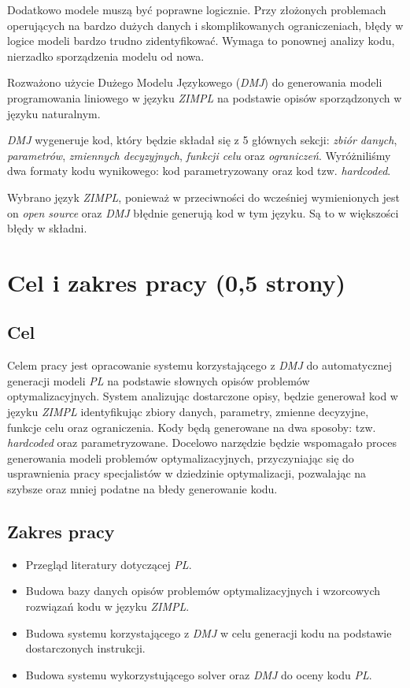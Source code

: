Dodatkowo modele muszą być poprawne logicznie. Przy złożonych problemach operujących na bardzo dużych danych i skomplikowanych ograniczeniach, błędy w logice modeli bardzo trudno zidentyfikować. Wymaga to ponownej analizy kodu, nierzadko sporządzenia modelu od nowa.

Rozważono użycie Dużego Modelu Językowego (\textit{DMJ}) do generowania modeli programowania liniowego w języku \textit{ZIMPL} na podstawie opisów sporządzonych w języku naturalnym.

\textit{DMJ} wygeneruje kod, który będzie składał się z 5 głównych sekcji: \textit{zbiór danych}, \textit{parametrów}, \textit{zmiennych decyzyjnych}, \textit{funkcji celu} oraz \textit{ograniczeń}. Wyróżniliśmy dwa formaty kodu wynikowego: kod parametryzowany oraz kod tzw. \textit{hardcoded}. 

Wybrano język \textit{ZIMPL}, ponieważ w przeciwności do wcześniej wymienionych jest on \textit{open source} oraz \textit{DMJ} błędnie generują kod w tym języku. Są to w większości błędy w składni.

\section{Cel i zakres pracy (0,5 strony)}

\subsection{Cel}
Celem pracy jest opracowanie systemu korzystającego z \textit{DMJ} do automatycznej generacji modeli \textit{PL} na podstawie słownych opisów problemów optymalizacyjnych. System analizując dostarczone opisy, będzie generował kod w języku \textit{ZIMPL} identyfikując zbiory danych, parametry, zmienne decyzyjne, funkcje celu oraz ograniczenia. Kody będą generowane na dwa sposoby: tzw. \textit{hardcoded} oraz parametryzowane. Docelowo narzędzie będzie wspomagało proces generowania modeli problemów optymalizacyjnych, przyczyniając się do usprawnienia pracy specjalistów w dziedzinie optymalizacji, pozwalając na szybsze oraz mniej podatne na błedy generowanie kodu.

\subsection{Zakres pracy}
\begin{itemize}
    \item Przegląd literatury dotyczącej \textit{PL}.
    \item Budowa bazy danych opisów problemów optymalizacyjnych i wzorcowych rozwiązań kodu w języku \textit{ZIMPL}.
    \item Budowa systemu korzystającego z \textit{DMJ} w celu generacji kodu na podstawie dostarczonych instrukcji.
    \item Budowa systemu wykorzystującego solver oraz \textit{DMJ} do oceny kodu \textit{PL}.
\end{itemize}

